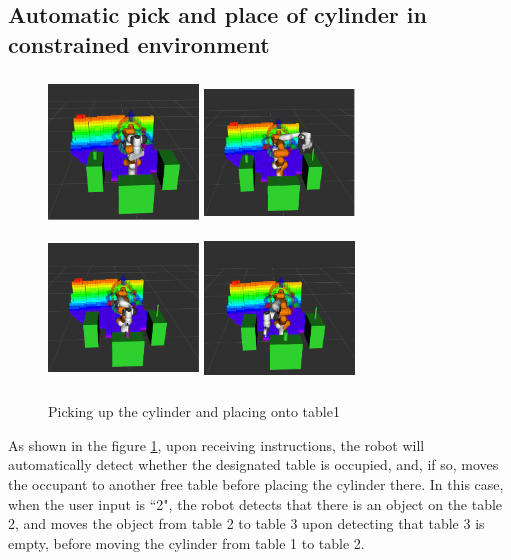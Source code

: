 \subsection{Automatic pick and place of cylinder in constrained environment}
\begin{figure}[h]
    \centering
    \includegraphics[width=4cm, height=4cm]{figures/2_pickStick.png}
    \includegraphics[width=4cm, height=4cm]{figures/2_placeStick.png}\\
    \includegraphics[width=4cm, height=4cm]{figures/2_pickCylinder.png}
    \includegraphics[width=4cm, height=4cm]{figures/2_placeCylinder.png}
    \caption{Picking up the cylinder and placing onto table1}
    \label{fig:2_pickPlace}
\end{figure}
As shown in the figure \ref{fig:2_pickPlace}, upon receiving instructions, the robot will automatically detect whether the designated table is occupied, and, if so, moves the occupant to another free table before placing the cylinder there. In this case, when the user input is ``2", the robot detects that there is an object on the table 2, and moves the object from table 2 to table 3 upon detecting that table 3 is empty, before moving the cylinder from table 1 to table 2. \\

